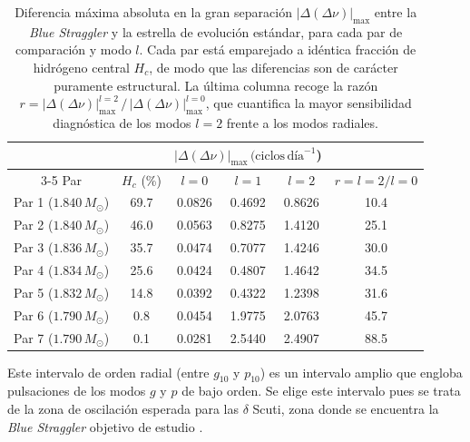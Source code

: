 \begin{table}[htpb]
  \centering
  \begin{tabular}{
      c
      c
      c
      c
      c
      c
    }
    \toprule
    & & \multicolumn{3}{c}{$|\Delta(\Delta\nu)|_\mathrm{max}\,(\text{ciclos}\,\text{día}^{-1}$)} & \\
    \cmidrule(lr){3-5}
    {Par} & {$H_c$ (\%)} & {$l = 0$} & {$l = 1$} & {$l = 2$} & {$r = l{=}2/l{=}0$} \\
    \midrule
    Par 1 ($1.840\,M_\odot$) & 69.7 & 0.0826 & 0.4692 & 0.8626 & 10.4 \\
    Par 2 ($1.840\,M_\odot$) & 46.0 & 0.0563 & 0.8275 & 1.4120 & 25.1 \\
    Par 3 ($1.836\,M_\odot$) & 35.7 & 0.0474 & 0.7077 & 1.4246 & 30.0 \\
    Par 4 ($1.834\,M_\odot$) & 25.6 & 0.0424 & 0.4807 & 1.4642 & 34.5 \\
    Par 5 ($1.832\,M_\odot$) & 14.8 & 0.0392 & 0.4322 & 1.2398 & 31.6 \\
    Par 6 ($1.790\,M_\odot$) &  0.8 & 0.0454 & 1.9775 & 2.0763 & 45.7 \\
    Par 7 ($1.790\,M_\odot$) &  0.1 & 0.0281 & 2.5440 & 2.4907 & 88.5 \\
    \bottomrule
  \end{tabular}
  \caption{Diferencia máxima absoluta en la gran separación $|\Delta(\Delta\nu)|_\mathrm{max}$ entre la \textit{Blue Straggler} y la estrella de evolución estándar, para cada par de comparación y modo $l$. Cada par está emparejado a idéntica fracción de hidrógeno central $H_c$, de modo que las diferencias son de carácter puramente estructural. La última columna recoge la razón $r = |\Delta(\Delta\nu)|_\mathrm{max}^{l=2}\,/\,|\Delta(\Delta\nu)|_\mathrm{max}^{l=0}$, que cuantifica la mayor sensibilidad diagnóstica de los modos $l=2$ frente a los modos radiales.}
  \label{tab:max_diff_dnu}
\end{table}

Este intervalo de orden radial (entre $g_{10}$ y $p_{10}$) es un intervalo amplio que engloba pulsaciones de los modos $g$ y $p$ de bajo orden. Se elige este intervalo pues se trata de la zona de oscilación esperada para las $\delta$ Scuti, zona donde se encuentra la \textit{Blue Straggler} objetivo de estudio \citep{Gatuam_2026}.


